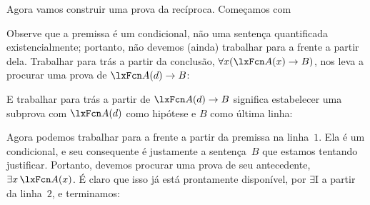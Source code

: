Agora vamos construir uma prova da recíproca. Começamos com
\begin{fitchproof}
	\PR
	\ellipsesline
\end{fitchproof}
Observe que a premissa é um condicional, não uma sentença quantificada existencialmente; portanto, não devemos (ainda) trabalhar para a frente a partir dela. Trabalhar para trás a partir da conclusão, $\forall x(\atom{A}{x} \eif B)$, nos leva a procurar uma prova de $\atom{A}{d} \eif B$:
\begin{fitchproof}
	\PR
	\ellipsesline
\end{fitchproof}
E trabalhar para trás a partir de $\atom{A}{d} \eif B$ significa estabelecer uma subprova com $\atom{A}{d}$ como hipótese e $B$ como última linha:
\begin{fitchproof}
	\PR
	\open
	\AS
	\ellipsesline
	\close
\end{fitchproof}
Agora podemos trabalhar para a frente a partir da premissa na linha~$1$. Ela é um condicional, e seu consequente é justamente a sentença~$B$ que estamos tentando justificar. Portanto, devemos procurar uma prova de seu antecedente, $\exists x\,\atom{A}{x}$. É claro que isso já está prontamente disponível, por $\exists$I a partir da linha~$2$, e terminamos:
\begin{fitchproof}
	\PR
	\open
	\AS
	\close
\end{fitchproof}

\practiceproblems

